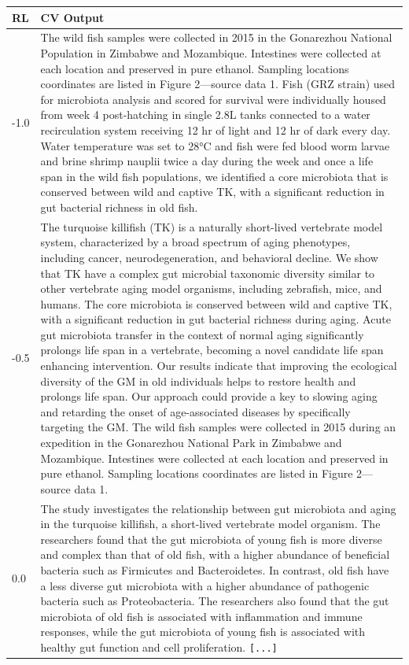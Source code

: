 \begin{table}[]
\centering
\scriptsize
\begin{tabular}{l|p{}}
\textbf{RL} & \textbf{CV Output} \\ \hline
-1.0 & The wild fish samples were collected in 2015 in the Gonarezhou National Population in Zimbabwe and Mozambique. Intestines were collected at each location and preserved in pure ethanol. Sampling locations coordinates are listed in Figure 2—source data 1. Fish (GRZ strain) used for microbiota analysis and scored for survival were individually housed from week 4 post-hatching in single 2.8L tanks connected to a water recirculation system receiving 12 hr of light and 12 hr of dark every day. Water temperature was set to 28°C and fish were fed blood worm larvae and brine shrimp nauplii twice a day during the week and once a life span in the wild fish populations, we identified a core microbiota that is conserved between wild and captive TK, with a significant reduction in gut bacterial richness in old fish. \\ \hline
-0.5 & The turquoise killifish (TK) is a naturally short-lived vertebrate model system, characterized by a broad spectrum of aging phenotypes, including cancer, neurodegeneration, and behavioral decline. We show that TK have a complex gut microbial taxonomic diversity similar to other vertebrate aging model organisms, including zebrafish, mice, and humans. The core microbiota is conserved between wild and captive TK, with a significant reduction in gut bacterial richness during aging. Acute gut microbiota transfer in the context of normal aging significantly prolongs life span in a vertebrate, becoming a novel candidate life span enhancing intervention. Our results indicate that improving the ecological diversity of the GM in old individuals helps to restore health and prolongs life span. Our approach could provide a key to slowing aging and retarding the onset of age-associated diseases by specifically targeting the GM. The wild fish samples were collected in 2015 during an expedition in the Gonarezhou National Park in Zimbabwe and Mozambique. Intestines were collected at each location and preserved in pure ethanol. Sampling locations coordinates are listed in Figure 2—source data 1. \\ \hline
0.0 & The study investigates the relationship between gut microbiota and aging in the turquoise killifish, a short-lived vertebrate model organism. The researchers found that the gut microbiota of young fish is more diverse and complex than that of old fish, with a higher abundance of beneficial bacteria such as Firmicutes and Bacteroidetes. In contrast, old fish have a less diverse gut microbiota with a higher abundance of pathogenic bacteria such as Proteobacteria. The researchers also found that the gut microbiota of old fish is associated with inflammation and immune responses, while the gut microbiota of young fish is associated with healthy gut function and cell proliferation. \texttt{[...]}

\end{tabular}
\end{table}
